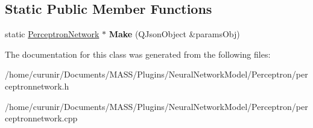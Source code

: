 \subsection*{Static Public Member Functions}
\begin{DoxyCompactItemize}
\item 
static \hyperlink{class_perceptron_network}{Perceptron\+Network} $\ast$ {\bfseries Make} (Q\+Json\+Object \&params\+Obj)\hypertarget{class_perceptron_network_a9acf3e33492a4163df20f6877a6f3db7}{}\label{class_perceptron_network_a9acf3e33492a4163df20f6877a6f3db7}

\end{DoxyCompactItemize}


The documentation for this class was generated from the following files\+:\begin{DoxyCompactItemize}
\item 
/home/curunir/\+Documents/\+M\+A\+S\+S/\+Plugins/\+Neural\+Network\+Model/\+Perceptron/perceptronnetwork.\+h\item 
/home/curunir/\+Documents/\+M\+A\+S\+S/\+Plugins/\+Neural\+Network\+Model/\+Perceptron/perceptronnetwork.\+cpp\end{DoxyCompactItemize}
